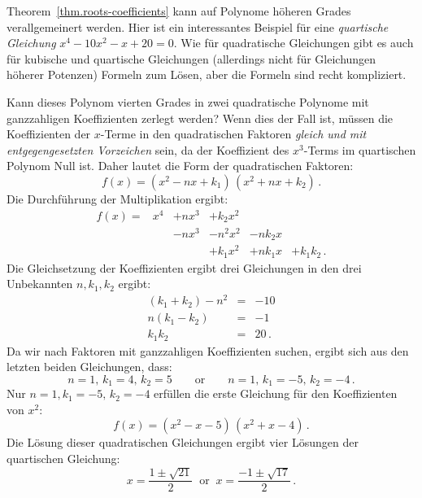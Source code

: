 \begin{example}
Theorem~\ref{thm.roots-coefficients} kann auf Polynome höheren Grades verallgemeinert werden. Hier ist ein interessantes Beispiel für eine \emph{quartische Gleichung} $x^4-10x^2-x+20=0$. Wie für quadratische Gleichungen gibt es auch für kubische und quartische Gleichungen (allerdings nicht für Gleichungen höherer Potenzen) Formeln zum Lösen, aber die Formeln sind recht kompliziert.

Kann dieses Polynom vierten Grades in zwei quadratische Polynome mit ganzzahligen Koeffizienten zerlegt werden? Wenn dies der Fall ist, müssen die Koeffizienten der $x$-Terme in den quadratischen Faktoren \emph{gleich und mit entgegengesetzten Vorzeichen} sein, da der Koeffizient des $x^3$-Terms im quartischen Polynom Null ist. Daher lautet die Form der quadratischen Faktoren:
\[
f(x) = (x^2 - nx + k_1)\, (x^2 + nx + k_2)\,.
\]
Die Durchführung der Multiplikation ergibt:
\[
\renewcommand{\arraystretch}{1.1}
\begin{array}{rrrrrr}
f(x) = &x^4 & + nx^3 & + k_2 x^2\\
&& -nx^3 &- n^2x^2 &-nk_2x\\
&&&+k_1x^2 &+ nk_1x &+ k_1k_2\,.
\end{array}
\]
Die Gleichsetzung der Koeffizienten ergibt drei Gleichungen in den drei Unbekannten $n,k_1,k_2$ ergibt:
\begin{eqnarray*}
(k_1+k_2)-n^2 &=& -10\\
n(k_1-k_2) &=& -1\\
k_1k_2 &=& 20\,.
\end{eqnarray*}
Da wir nach Faktoren mit ganzzahligen Koeffizienten suchen, ergibt sich aus den letzten beiden Gleichungen, dass:
\[
n=1,\,k_1=4,\,k_2=5  \quad\quad\textrm{or} \quad\quad n=1,\,k_1=-5,\, k_2=-4\,.
\]
Nur $n=1,k_1=-5,\, k_2=-4$ erfüllen die erste Gleichung für den Koeffizienten von $x^2$:
\[
f(x) = (x^2 - x - 5)\, (x^2 + x - 4)\,.
\]
Die Lösung dieser quadratischen Gleichungen ergibt vier Lösungen der quartischen Gleichung:
\[
x = \frac{1\pm\sqrt{21}}{2}  \;\;\textrm{or} \;\; x= \frac{-1\pm\sqrt{17}}{2} \,.
\]
\end{example}


